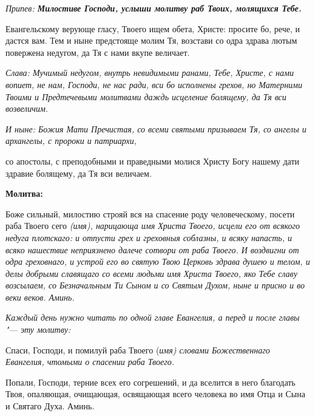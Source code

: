 \itshape Припев: \normalfont{}\bfseries Милостиве Господи, услыши молитву раб Твоих, молящихся Тебе.

\normalfont{}Евангельскому верующе гласу, Твоего ищем обета, Христе: просите бо, рече, и дастся вам. Тем и ныне предстояще молим Тя, возстави со одра здрава лютым повержена недугом, да Тя с нами вкупе величает.

\itshape Слава: \normalfont{}Мучимый недугом, внутрь невидимыми ранами, Тебе, Христе, с нами вопиет, не нам, Господи, не нас ради, вси бо исполнены грехов, но Матерними Твоими и Предтечевыми молитвами даждь исцеление болящему, да Тя вси возвеличим.

\itshape И ныне: \normalfont{}Божия Мати Пречистая, со всеми святыми призываем Тя, со ангелы и архангелы, с пророки и патриархи,

со апостолы, с преподобными и праведными молися Христу Богу нашему дати здравие болящему, да Тя вси величаем.


\medskip


\bfseries Молитва:\normalfont{}


Боже сильный, милостию строяй вся на спасение роду человеческому, посети раба Твоего сего \itshape (имя), \normalfont{}нарицающа имя Христа Твоего, исцели его от всякого недуга плотскаго: и отпусти грех и греховныя соблазны, и всяку напасть, и всяко нашествие неприязнено далече сотвори от раба Твоего. И воздвигни от одра греховнаго, и устрой его во святую Твою Церковь здрава душею и телом, и делы добрыми славящаго со всеми людьми имя Христа Твоего, яко Тебе славу возсылаем, со Безначальным Ти Сыном и со Святым Духом, ныне и присно и во веки веков. Аминь.


\mychapterending

 


\itshape Каждый день нужно читать по одной главе Евангелия, а перед и после главы "--- эту молитву:\normalfont{}




Спаси, Господи, и помилуй раба Твоего (\itshape имя\normalfont{}) словами Божественнаго Евангелия, чтомыми о спасении раба Твоего. 

Попали, Господи, терние всех его согрешений, и да вселится в него благодать Твоя, опаляющая, очищающая, освящающая всего человека во имя Отца и Сына и Святаго Духа. Аминь.





